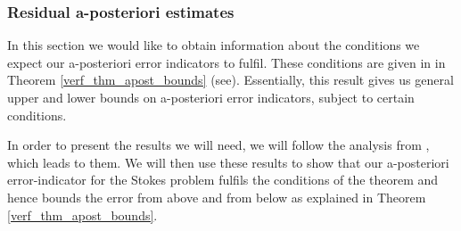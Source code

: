 \documentclass[12pt,a4paper]{article}
\theoremstyle{definition}
\begin{document}
\subsubsection{Residual a-posteriori estimates}
In this section we would like to obtain information about the conditions we expect our a-posteriori error indicators to fulfil.  These conditions are given in in Theorem \ref{verf_thm_apost_bounds} (see\cite[Theorem 4.7]{verfurth2013posteriori}).  Essentially, this result gives us general upper and lower bounds on a-posteriori error indicators, subject to certain conditions.  

In order to present the results we will need, we will follow the analysis from \cite[\S4.1.4]{verfurth2013posteriori}, which leads to them.  We will then use these results to show that our a-posteriori error-indicator for the Stokes problem fulfils the conditions of the theorem and hence bounds the error from above and from below as explained in Theorem \ref{verf_thm_apost_bounds}.  
\end{document}
